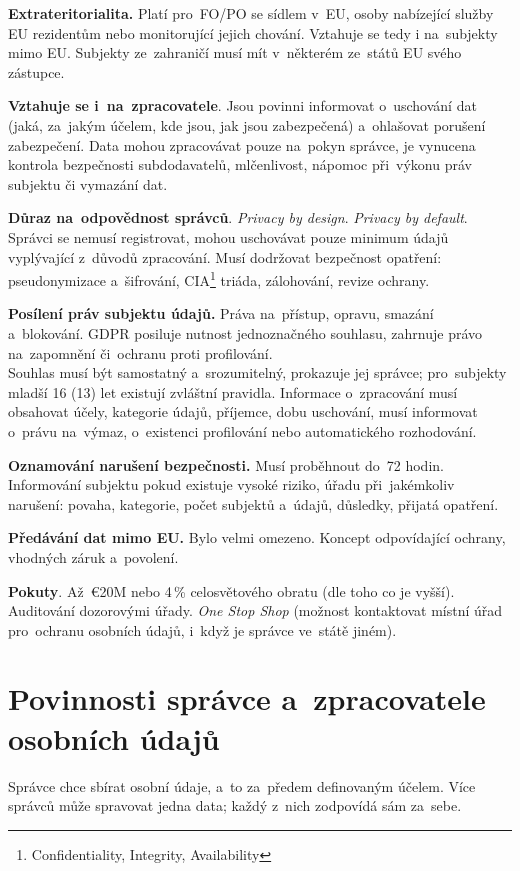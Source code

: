 \textbf{Extrateritorialita.} Platí pro~FO/PO se sídlem v~EU, osoby nabízející služby EU rezidentům nebo monitorující jejich chování. Vztahuje se tedy i na~subjekty mimo EU. Subjekty ze~zahraničí musí mít v~některém ze~států EU svého zástupce.

\textbf{Vztahuje se i~na~zpracovatele}. Jsou povinni informovat o~uschování dat (jaká, za~jakým účelem, kde jsou, jak jsou zabezpečená) a~ohlašovat porušení zabezpečení. Data mohou zpracovávat pouze na~pokyn správce, je vynucena kontrola bezpečnosti subdodavatelů, mlčenlivost, nápomoc při~výkonu práv subjektu či vymazání dat.

\textbf{Důraz na~odpovědnost správců}. \emph{Privacy by design}. \emph{Privacy by default}. Správci se nemusí registrovat, mohou uschovávat pouze minimum údajů vyplývající z~důvodů zpracování. Musí dodržovat bezpečnost opatření: pseudonymizace a~šifrování, CIA\footnote{Confidentiality, Integrity, Availability} triáda, zálohování, revize ochrany.

\textbf{Posílení práv subjektu údajů.} Práva na~přístup, opravu, smazání a~blokování. GDPR posiluje nutnost jednoznačného souhlasu, zahrnuje právo na~zapomnění či~ochranu proti profilování. \\
Souhlas musí být samostatný a~srozumitelný, prokazuje jej správce; pro~subjekty mladší 16 (13) let existují zvláštní pravidla. Informace o~zpracování musí obsahovat účely, kategorie údajů, příjemce, dobu uschování, musí informovat o~právu na~výmaz, o~existenci profilování nebo automatického rozhodování.

\textbf{Oznamování narušení bezpečnosti.} Musí proběhnout do~72 hodin. Informování subjektu pokud existuje vysoké riziko, úřadu při~jakémkoliv narušení: povaha, kategorie, počet subjektů a~údajů, důsledky, přijatá opatření.

\textbf{Předávání dat mimo EU.} Bylo velmi omezeno. Koncept odpovídající ochrany, vhodných záruk a~povolení.

\textbf{Pokuty}. Až~€20M nebo 4\,\% celosvětového obratu (dle toho co je vyšší). Auditování dozorovými úřady. \emph{One Stop Shop} (možnost kontaktovat místní úřad pro~ochranu osobních údajů, i~když je správce ve~státě jiném).

\clearpage
\section{Povinnosti správce a~zpracovatele osobních údajů}
\label{question-7}

Správce chce sbírat osobní údaje, a~to za~předem definovaným účelem. Více správců může spravovat jedna data; každý z~nich zodpovídá sám za~sebe.

